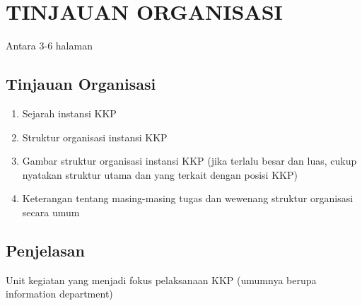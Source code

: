 
\chapter[TINJAUAN ORGANISASI]{\\ TINJAUAN ORGANISASI}

Antara 3-6 halaman

\section{Tinjauan Organisasi}
\begin{sectioncontent}
    \begin{enumerate}[leftmargin=0.5cm]
        \item Sejarah instansi KKP
    
        \item Struktur organisasi instansi KKP
        
        \item Gambar struktur organisasi instansi KKP (jika terlalu besar dan luas, cukup nyatakan struktur utama dan yang terkait dengan posisi KKP)

        \item Keterangan tentang masing-masing tugas dan wewenang struktur organisasi secara umum
    \end{enumerate}
\end{sectioncontent}

\section{Penjelasan}
\begin{sectioncontent}
    Unit kegiatan yang menjadi fokus pelaksanaan KKP (umumnya berupa information department)
\end{sectioncontent}